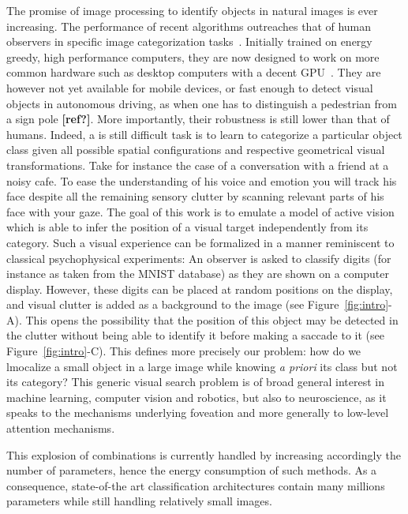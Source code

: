 The promise of image processing to identify objects in natural images is ever increasing. The performance of recent algorithms outreaches that of human observers in specific image categorization tasks~\citep{He15}. Initially trained on energy greedy, high performance computers, they are now designed to work on more common hardware such as desktop computers with a decent GPU~\citep{Sandler18}.
They are however not yet available for mobile devices, or fast enough to detect visual objects in autonomous driving, as when one has to distinguish a pedestrian from a sign pole {\bf [ref?]}. More importantly, their robustness is still lower than that of humans. Indeed, a is still difficult task is to learn to categorize a particular object class given all possible spatial configurations and respective geometrical visual transformations. Take for instance the case of a conversation with a friend at a noisy cafe. To ease the understanding of his voice and emotion you will track his face despite all the remaining sensory clutter by scanning relevant parts of his face with your gaze. 
The goal of this work is to emulate a model of active vision which is able to infer the position of a visual target independently from its category. Such a visual experience can be formalized in a manner reminiscent to classical psychophysical experiments: An observer is asked to classify digits (for instance as taken from the MNIST database) as they are shown on a computer display. However, these digits can be placed at random positions on the display, and visual clutter is added as a background to the image (see Figure~\ref{fig:intro}-A). This opens the possibility that the position of this object may be detected in the clutter without being able to identify it before making a saccade to it (see Figure~\ref{fig:intro}-C). This defines more precisely our problem: how do we lmocalize a small object in a large image while knowing \emph{a priori} its class but not its category? This generic visual search problem is of broad general interest in machine learning, computer vision and robotics, but also to neuroscience, as it speaks to the mechanisms underlying foveation and more generally to low-level attention mechanisms.

This explosion of combinations is currently handled by increasing accordingly the number of parameters, hence the energy consumption of such methods. As a consequence, state-of-the art classification architectures contain many millions parameters while still handling relatively small images.

